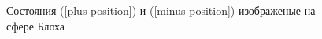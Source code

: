 \documentclass[14pt,a4paper]{PhDthesis}
\begin{document}
\begin{figure}[h]
\begin{minipage}[h]{0.49\linewidth}
\end{minipage}
\hfill
\begin{minipage}[h]{0.49\linewidth}
\end{minipage}
\caption{Состояния (\ref{plus-position}) и (\ref{minus-position}) изображеные на сфере Блоха}
\label{ris:image1}
\end{figure}
\end{document}
